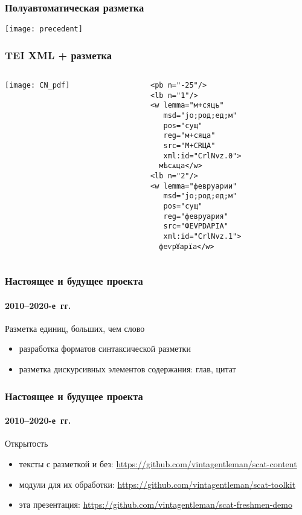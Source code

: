 \begin{frame}
  \frametitle{Полуавтоматическая разметка}

  \begin{center}
    \texttt{[image: precedent]}
  \end{center}
\end{frame}

\begin{frame}[fragile]
  \frametitle{TEI XML + разметка}

  \begin{columns}[c]
    \begin{column}{6cm}
      \texttt{[image: CN\_pdf]}
    \end{column}

    \begin{column}{6cm}
      \begin{Verbatim}[fontsize=\footnotesize]
<pb n="-25"/>
<lb n="1"/>
<w lemma="м+сяць"
   msd="jo;род;ед;м"
   pos="сущ"
   reg="м+сяца"
   src="М+СRЦА"
   xml:id="CrlNvz.0">
  мѣсѧца</w>
<lb n="2"/>
<w lemma="февруарии"
   msd="jo;род;ед;м"
   pos="сущ"
   reg="февруария"
   src="ФЕVРDАРIА"
   xml:id="CrlNvz.1">
  феѵрꙋарїа</w>
\end{Verbatim}
    \end{column}
  \end{columns}
\end{frame}

\begin{frame}
  \frametitle{Настоящее и будущее проекта}
  \framesubtitle{2010--2020-е~гг.}

  \begin{block}{Разметка единиц, больших, чем слово}
    \begin{itemize}
      \item разработка форматов синтаксической разметки\autocite{gorlov:2018}
      \item разметка дискурсивных элементов содержания: глав\autocite{rogozina:2015}, цитат\autocite{alexeeva:2019}
    \end{itemize}
  \end{block}
\end{frame}

\begin{frame}
  \frametitle{Настоящее и будущее проекта}
  \framesubtitle{2010--2020-е~гг.}

  \begin{block}{Открытость}
    \begin{itemize}
      \item тексты с разметкой и без: \url{https://github.com/vintagentleman/scat-content}
      \item модули для их обработки: \url{https://github.com/vintagentleman/scat-toolkit}
      \item эта презентация: \url{https://github.com/vintagentleman/scat-freshmen-demo}
    \end{itemize}
  \end{block}
\end{frame}

